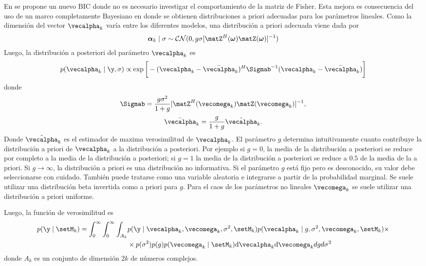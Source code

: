 	En \cite{Nielsen2013} se propone un nuevo BIC donde no es necesario investigar el comportamiento de la matriz de Fisher. Esta mejora es consecuencia del uso de un marco completamente Bayesiano en donde se obtienen distribuciones a priori adecuadas para los parámetros lineales. Como la dimensión del vector $\vecalpha_k$ varía entre los diferentes modelos, una distribución a priori adecuada viene dada por \cite{Zellner88}
	\begin{equation}
		\boldsymbol{\alpha}_k\mid \sigma \sim \mathcal{CN}(0,g\sigma[\matZ^H(\boldsymbol{\omega})\matZ(\boldsymbol{\omega})]^{-1})
		\label{eq:BIC10}
	\end{equation}
	Luego, la distribución a posteriori del parámetro $\vecalpha_k$ es
	\begin{equation}
		p(\vecalpha_k\mid \y, \sigma) \propto \exp\bigg[-(\vecalpha_k-\bar{\vecalpha}_k)^H\Sigmab^{-1}(\vecalpha_k-\bar{\vecalpha}_k)\bigg]
	\end{equation}
	donde
	\begin{equation}
		\Sigmab = \frac{g\sigma^2}{1+g}[\matZ^H(\vecomega_k)\matZ(\vecomega_k)]^{-1},
	\end{equation}
	\begin{equation}
		\bar{\vecalpha}_k = \frac{g}{1+g}\hat{\vecalpha}_k.
	\end{equation}
	Donde $\hat{\vecalpha}_k$ es el estimador de maxima verosimilitud de $\vecalpha_k$. El parámetro $g$ determina intuitivamente cuanto contribuye la distribución a priori de $\vecalpha_k$ a la distribución a posteriori. Por ejemplo si $g=0$, la media de la distribución a posteriori se reduce por completo a la media de la distribución a posteriori; si $g=1$ la media de la distribución a posteriori se reduce a $0.5$ de la media de la a priori. Si $g\to\infty$, la distribución a priori es una distribución no informativa. Si el parámetro $g$ está fijo pero es desconocido, su valor debe seleccionarse con cuidado. También puede tratarse como una variable aleatoria e integrarse a partir de la probabilidad marginal. Se suele utilizar una distribución beta invertida como a priori para $g$. Para el caos de los parámetros no lineales $\vecomega_k$ se suele utilizar una distribución a priori uniforme.
	
	Luego, la función de verosimilitud es
	\begin{equation}
		\begin{aligned}
			p(\y\mid\setM_k) = \int_{0}^\infty \int_{0}^\infty \int_{A_k} & p(\y\mid\vecalpha_k,\vecomega_k,\sigma^2,\setM_k)p(\vecalpha_k\mid g,\sigma^2,\vecomega_k,\setM_k) \times \\& \times p(\sigma^2)p(g)p(\vecomega_k\mid\setM_k)\mathrm{d}\vecalpha_k\mathrm{d}\vecomega_kdgd\sigma^2
		\end{aligned} \label{eq:BIC11}
	\end{equation}
	donde $A_k$ es un conjunto de dimensión $2k$ de números complejos.
	
